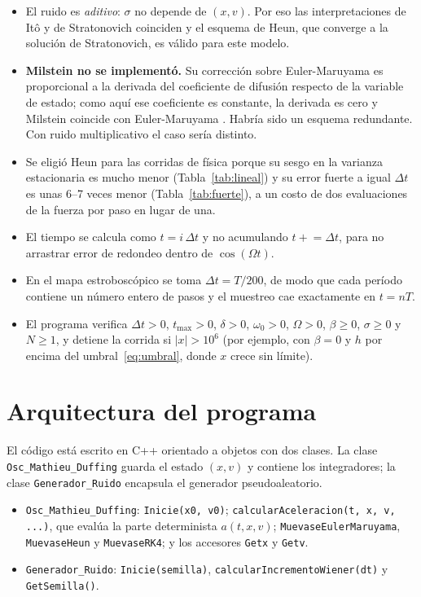 \documentclass[12pt,a4paper]{article}
\begin{document}
\begin{itemize}
    \item El ruido es \emph{aditivo}: $\sigma$ no depende de $(x,v)$. Por eso las interpretaciones de Itô y de Stratonovich coinciden y el esquema de Heun, que converge a la solución de Stratonovich, es válido para este modelo.
    \item \textbf{Milstein no se implementó.} Su corrección sobre Euler-Maruyama es proporcional a la derivada del coeficiente de difusión respecto de la variable de estado; como aquí ese coeficiente es constante, la derivada es cero y Milstein coincide con Euler-Maruyama \cite{kloeden1992}. Habría sido un esquema redundante. Con ruido multiplicativo el caso sería distinto.
    \item Se eligió Heun para las corridas de física porque su sesgo en la varianza estacionaria es mucho menor (Tabla~\ref{tab:lineal}) y su error fuerte a igual $\Delta t$ es unas 6--7 veces menor (Tabla~\ref{tab:fuerte}), a un costo de dos evaluaciones de la fuerza por paso en lugar de una.
    \item El tiempo se calcula como $t=i\,\Delta t$ y no acumulando $t\mathrel{+}=\Delta t$, para no arrastrar error de redondeo dentro de $\cos(\Omega t)$.
    \item En el mapa estroboscópico se toma $\Delta t=T/200$, de modo que cada período contiene un número entero de pasos y el muestreo cae exactamente en $t=nT$.
    \item El programa verifica $\Delta t>0$, $t_{\max}>0$, $\delta>0$, $\omega_0>0$, $\Omega>0$, $\beta\ge0$, $\sigma\ge0$ y $N\ge1$, y detiene la corrida si $|x|>10^{6}$ (por ejemplo, con $\beta=0$ y $h$ por encima del umbral~\eqref{eq:umbral}, donde $x$ crece sin límite).
\end{itemize}

\section{Arquitectura del programa}

El código está escrito en C++ orientado a objetos con dos clases. La clase \texttt{Osc\_Mathieu\_Duffing} guarda el estado $(x,v)$ y contiene los integradores; la clase \texttt{Generador\_Ruido} encapsula el generador pseudoaleatorio.

\begin{itemize}
    \item \texttt{Osc\_Mathieu\_Duffing}: \texttt{Inicie(x0, v0)}; \texttt{calcularAceleracion(t, x, v, ...)}, que evalúa la parte determinista $a(t,x,v)$; \texttt{MuevaseEulerMaruyama}, \texttt{MuevaseHeun} y \texttt{MuevaseRK4}; y los accesores \texttt{Getx} y \texttt{Getv}.
    \item \texttt{Generador\_Ruido}: \texttt{Inicie(semilla)}, \texttt{calcularIncrementoWiener(dt)} y \texttt{GetSemilla()}.
\end{itemize}
\end{document}
